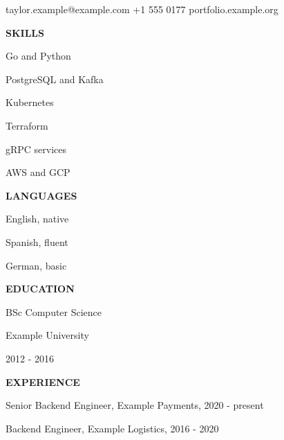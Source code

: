 \documentclass[10pt]{article}
\begin{document}
{\LARGE \Person}\par taylor.example@example.com \quad +1 555 0177 \quad portfolio.example.org\par\bigskip
\begin{minipage}[t]{0.3\textwidth}
\textbf{SKILLS}\par Go and Python\par PostgreSQL and Kafka\par Kubernetes\par Terraform\par gRPC services\par AWS and GCP\par\medskip
\textbf{LANGUAGES}\par English, native\par Spanish, fluent\par German, basic\par\medskip
\textbf{EDUCATION}\par BSc Computer Science\par Example University\par 2012 - 2016\par
\end{minipage}\hfill
\begin{minipage}[t]{0.64\textwidth}
\textbf{EXPERIENCE}\par
Senior Backend Engineer, Example Payments, 2020 - present\par
\JobA\par \JobB\par \JobC\par\medskip
Backend Engineer, Example Logistics, 2016 - 2020\par
\JobB\par \JobA\par
\end{minipage}
\end{document}
